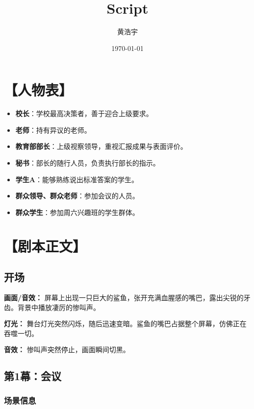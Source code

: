 \documentclass[11pt, a4paper]{article}
\title{Script}
\author{黄浩宇}
\date{\today}
\begin{document}
	
	\maketitle
	\newpage
	
	\tableofcontents
	\newpage
	
	\section{【人物表】}
	
	\begin{itemize}[leftmargin=2em, itemsep=0.2em]
		\item \textbf{校长}：学校最高决策者，善于迎合上级要求。
		\item \textbf{老师}：持有异议的老师。
		\item \textbf{教育部部长}：上级视察领导，重视汇报成果与表面评价。
		\item \textbf{秘书}：部长的随行人员，负责执行部长的指示。
		\item \textbf{学生A}：能够熟练说出标准答案的学生。
		\item \textbf{群众领导、群众老师}：参加会议的人员。
		\item \textbf{群众学生}：参加周六兴趣班的学生群体。
	\end{itemize}
	
	\newpage
	
	\section{【剧本正文】}
	
	\subsection{开场}
	
	\textbf{画面/音效：}
	屏幕上出现一只巨大的鲨鱼，张开充满血腥感的嘴巴，露出尖锐的牙齿。背景中播放凄厉的惨叫声。
	
	\textbf{灯光：}
	舞台灯光突然闪烁，随后迅速变暗。鲨鱼的嘴巴占据整个屏幕，仿佛正在吞噬一切。
	
	\textbf{音效：}
	惨叫声突然停止，画面瞬间切黑。
	
	\vspace{1em}
	
	\subsection{第1幕：会议}
	
	\subsubsection{场景信息}
	
\end{document}
